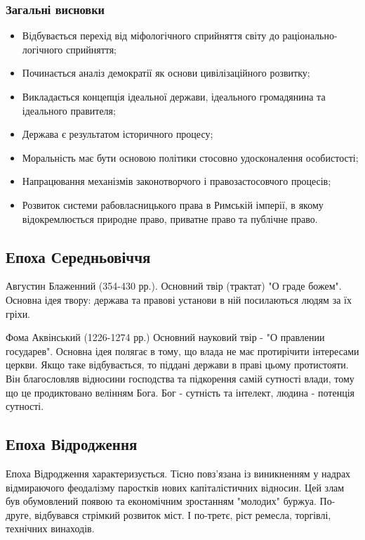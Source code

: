 \subsubsection{Загальні висновки}
\begin{itemize}
\item Відбувається перехід від міфологічного сприйняття світу до раціонально-логічного сприйняття;
\item Починається аналіз демократії як основи цивілізаційного розвитку;
\item Викладається концепція ідеальної держави, ідеального громадянина та ідеального правителя;
\item Держава є результатом історичного процесу;
\item Моральність має бути основою політики стосовно удосконалення особистості;
\item Напрацювання механізмів законотворчого і правозастосовчого процесів;
\item Розвиток системи рабовласницького права в Римській імперії, в якому відокремлюється природне право, приватне право та публічне право.
\end{itemize}
\subsection{Епоха Середньовіччя}
\indent Августин Блаженний (354-430 рр.). Основний твір (трактат) "О граде божем". Основна ідея твору: держава та правові установи в ній посилаються людям за їх гріхи.

Фома Аквінський (1226-1274 рр.) Основний науковий твір - "О правлении государев". Основна ідея полягає в тому, що влада не має протирічити інтересами церкви. Якщо таке відбувається, то піддані держави в праві цьому протистояти. Він благословляв відносини господства та підкорення самій сутності влади, тому що це продиктовано велінням Бога. Бог - сутність та інтелект, людина - потенція сутності.
\subsection{Епоха Відродження}
Епоха Відродження характеризується. Тісно повз’язана із виникненням у надрах відмираючого феодалізму паростків нових капіталістичних відносин. Цей злам був обумовлений появою та економічним зростанням "молодих" буржуа. По-друге, відбувався стрімкий розвиток міст. І по-третє, ріст ремесла, торгівлі, технічних винаходів.